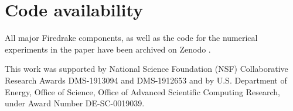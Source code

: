 \documentclass[format=acmsmall,screen,timestamp=false,a4paper]{acmart}
\newcommand\josh[1]{\textbf{\textcolor[rgb]{0,.5,1}{[Josh: #1]}}}
\begin{document}




\section*{Code availability}

All major Firedrake components, as well as the code for the numerical experiments in the paper have been archived on Zenodo \cite{zenodo/2021}. 

\begin{acks}
This work was supported by National Science Foundation (NSF) Collaborative Research Awards DMS-1913094 and DMS-1912653 and by U.S. Department of Energy, Office of Science, Office of Advanced Scientific Computing Research, under Award Number DE-SC-0019039. 
    
  
\end{acks}
\end{document}
